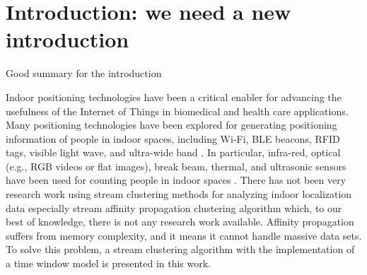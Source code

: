 \setlength{\parindent}{2em}
% 
\chapter{Introduction: we need a new introduction}

Good summary for the introduction

Indoor positioning technologies have been a critical enabler for advancing the usefulness of the Internet of Things in biomedical and health care applications. Many positioning technologies have been explored for generating positioning information of people in indoor spaces, including Wi-Fi, BLE beacons, RFID tags, visible light wave, and ultra-wide band \cite{namiot2015indoor, jeon2018ble}. In particular, infra-red, optical (e.g., RGB videos or flat images), break beam, thermal, and ultrasonic sensors have been used for counting people in indoor spaces \cite{mautz2012indoor}. There has not been very research work using stream clustering methods for analyzing indoor localization data especially stream affinity propagation clustering algorithm \cite{dueck2009affinity} which, to our best of knowledge, there is not any research work available. Affinity propagation suffers from memory complexity, and it means it cannot handle massive data sets. To solve this problem, a stream clustering algorithm with the implementation of a time window model is presented in this work. 


